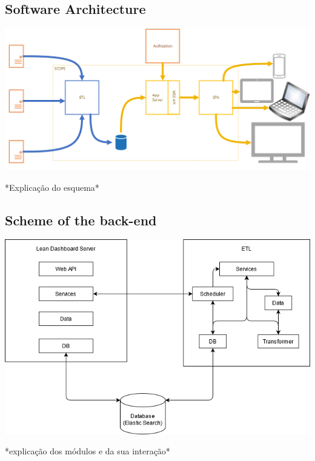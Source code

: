 \documentclass[a4paper,twoside,10pt]{report}
\begin{document}
\newpage
\subsection{Software Architecture}

\begin{center}
    \includegraphics[width=\textwidth]{lean-dashboard-software-architecture.png}
\end{center}

*Explicação do esquema*

\subsection{Scheme of the back-end}
\begin{center}
    \includegraphics[width=\textwidth]{arquitetura_software.png}
\end{center}
*explicação dos módulos e da sua interação*

\newpage
\end{document}
